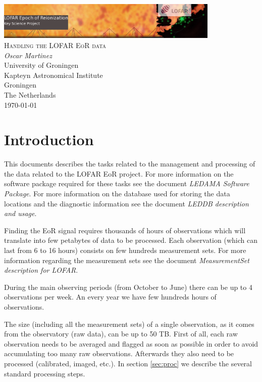 \documentclass[a4paper,11pt]{article}
\begin{document}
\begin{titlepage}
\begin{center}
\includegraphics[width=0.8\textwidth]{fig/eorlogo}\\[3cm]    
\textsc{\LARGE Handling the LOFAR EoR data}\\[0.5cm]
\vfill
{\large 
\emph{Oscar Martinez} \\
University of Groningen \\ 
Kapteyn Astronomical Institute \\
Groningen \\
The Netherlands \\
\today}
\end{center}
\end{titlepage}

\tableofcontents
\newpage

\section {Introduction}

This documents describes the tasks related to the management and processing of the data related to the LOFAR EoR project. For more information on the software package required for these tasks see the document \textit{LEDAMA Software Package}. For more information on the database used for storing the data locations and the diagnostic information see the document \textit{LEDDB description and usage}.

Finding the EoR signal requires thousands of hours of observations which will translate into few petabytes of data to be processed. Each observation (which can last from 6 to 16 hours) consists on few hundreds measurement sets. For more information regarding the measurement sets see the document \textit{MeasurementSet description for LOFAR}. 

During the main observing periods (from October to June) there can be up to 4 observations per week. An every year we have few hundreds hours  of observations.

The size (including all the measurement sets) of a single observation, as it comes from the observatory (raw data), can be up to 50 TB. First of all, each raw observation needs to be averaged and flagged as soon as possible in order to avoid accumulating too many raw observations. Afterwards they also need to be processed (calibrated, imaged, etc.). In section \ref{sec:proc} we describe the several standard processing steps.
\end{document}

